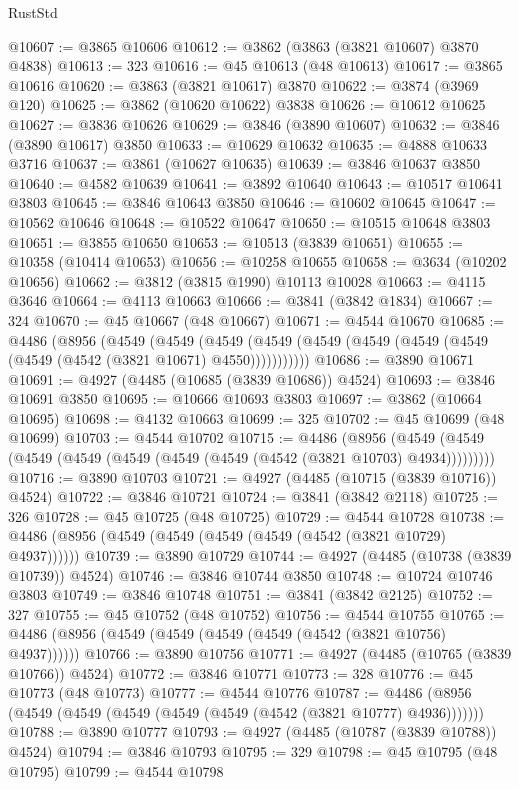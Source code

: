 \begin{lexlean}{RustStd}
\begin{coremodule}
@10607 := @3865 @10606
@10612 := @3862 (@3863 (@3821 @10607) @3870 @4838)
@10613 := 323
@10616 := @45 @10613 (@48 @10613)
@10617 := @3865 @10616
@10620 := @3863 (@3821 @10617) @3870
@10622 := @3874 (@3969 @120)
@10625 := @3862 (@10620 @10622) @3838
@10626 := @10612 @10625
@10627 := @3836 @10626
@10629 := @3846 (@3890 @10607)
@10632 := @3846 (@3890 @10617) @3850
@10633 := @10629 @10632
@10635 := @4888 @10633 @3716
@10637 := @3861 (@10627 @10635)
@10639 := @3846 @10637 @3850
@10640 := @4582 @10639
@10641 := @3892 @10640
@10643 := @10517 @10641 @3803
@10645 := @3846 @10643 @3850
@10646 := @10602 @10645
@10647 := @10562 @10646
@10648 := @10522 @10647
@10650 := @10515 @10648 @3803
@10651 := @3855 @10650
@10653 := @10513 (@3839 @10651)
@10655 := @10358 (@10414 @10653)
@10656 := @10258 @10655
@10658 := @3634 (@10202 @10656)
@10662 := @3812 (@3815 @1990) @10113 @10028
@10663 := @4115 @3646
@10664 := @4113 @10663
@10666 := @3841 (@3842 @1834)
@10667 := 324
@10670 := @45 @10667 (@48 @10667)
@10671 := @4544 @10670
@10685 := @4486
    (@8956
      (@4549
        (@4549
          (@4549 (@4549 (@4549 (@4549 (@4549 (@4549 (@4549 (@4542 (@3821 @10671) @4550)))))))))))
@10686 := @3890 @10671
@10691 := @4927 (@4485 (@10685 (@3839 @10686)) @4524)
@10693 := @3846 @10691 @3850
@10695 := @10666 @10693 @3803
@10697 := @3862 (@10664 @10695)
@10698 := @4132 @10663
@10699 := 325
@10702 := @45 @10699 (@48 @10699)
@10703 := @4544 @10702
@10715 := @4486
    (@8956 (@4549 (@4549 (@4549 (@4549 (@4549 (@4549 (@4549 (@4542 (@3821 @10703) @4934)))))))))
@10716 := @3890 @10703
@10721 := @4927 (@4485 (@10715 (@3839 @10716)) @4524)
@10722 := @3846 @10721
@10724 := @3841 (@3842 @2118)
@10725 := 326
@10728 := @45 @10725 (@48 @10725)
@10729 := @4544 @10728
@10738 := @4486 (@8956 (@4549 (@4549 (@4549 (@4549 (@4542 (@3821 @10729) @4937))))))
@10739 := @3890 @10729
@10744 := @4927 (@4485 (@10738 (@3839 @10739)) @4524)
@10746 := @3846 @10744 @3850
@10748 := @10724 @10746 @3803
@10749 := @3846 @10748
@10751 := @3841 (@3842 @2125)
@10752 := 327
@10755 := @45 @10752 (@48 @10752)
@10756 := @4544 @10755
@10765 := @4486 (@8956 (@4549 (@4549 (@4549 (@4549 (@4542 (@3821 @10756) @4937))))))
@10766 := @3890 @10756
@10771 := @4927 (@4485 (@10765 (@3839 @10766)) @4524)
@10772 := @3846 @10771
@10773 := 328
@10776 := @45 @10773 (@48 @10773)
@10777 := @4544 @10776
@10787 := @4486 (@8956 (@4549 (@4549 (@4549 (@4549 (@4549 (@4542 (@3821 @10777) @4936)))))))
@10788 := @3890 @10777
@10793 := @4927 (@4485 (@10787 (@3839 @10788)) @4524)
@10794 := @3846 @10793
@10795 := 329
@10798 := @45 @10795 (@48 @10795)
@10799 := @4544 @10798

\end{coremodule}
\end{lexlean}
